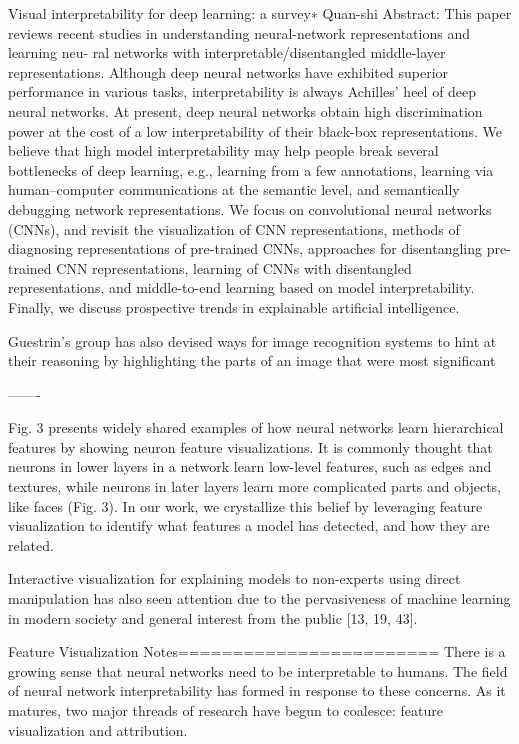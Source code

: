 
Visual interpretability for deep learning: a survey∗ Quan-shi
Abstract: This paper reviews recent studies in understanding neural-network representations and learning neu- ral networks with interpretable/disentangled middle-layer representations. Although deep neural networks have exhibited superior performance in various tasks, interpretability is always Achilles’ heel of deep neural networks. At present, deep neural networks obtain high discrimination power at the cost of a low interpretability of their black-box representations. We believe that high model interpretability may help people break several bottlenecks of deep learning, e.g., learning from a few annotations, learning via human–computer communications at the semantic level, and semantically debugging network representations. We focus on convolutional neural networks (CNNs), and revisit the visualization of CNN representations, methods of diagnosing representations of pre-trained CNNs, approaches for disentangling pre-trained CNN representations, learning of CNNs with disentangled representations, and middle-to-end learning based on model interpretability. Finally, we discuss prospective trends in explainable artificial intelligence.

Guestrin’s group has also devised ways for image recognition systems to hint at their reasoning by highlighting the parts of an image that were most significant

-------

Fig. 3 presents widely shared examples of how
neural networks learn hierarchical features by showing neuron feature
visualizations. It is commonly thought that neurons in lower layers in
a network learn low-level features, such as edges and textures, while
neurons in later layers learn more complicated parts and objects, like
faces (Fig. 3). In our work, we crystallize this belief by leveraging
feature visualization to identify what features a model has detected, and
how they are related.

Interactive visualization for explaining models to non-experts using direct manipulation has also seen attention due to the pervasiveness of machine learning in modern society and general interest from the public [13, 19, 43].


Feature Visualization Notes========================
There is a growing sense that neural networks need to be interpretable to humans. The field of neural network interpretability has formed in response to these concerns. As it matures, two major threads of research have begun to coalesce: feature visualization and attribution.

